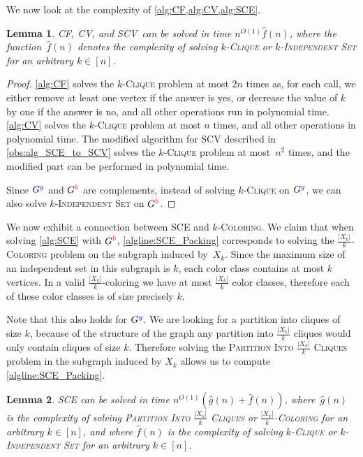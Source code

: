 \documentclass[a4paper,fleqn]{cas-sc}
\newcommand{\friendshipColor}{blue}
\newcommand{\enemyColor}{red}
\newcommand{\agentSetInMaxCoalition}{\ensuremath{X}\xspace}
\newcommand{\friendSuperscript}{{\color{\friendshipColor}g}}
\newcommand{\enemySuperscript}{{\color{\enemyColor}b}}
\newcommand{\friendshipGraph}{\ensuremath{G^{\friendSuperscript}}\xspace}
\newcommand{\enemyGraph}{\ensuremath{G^{\enemySuperscript}}\xspace}
\newcommand{\probname}[1]{\textsc{#1}}
\newcommand{\kclique}[1]{\probname{#1-Clique}\xspace}
\newcommand{\kIS}[1]{\probname{#1-Independent Set}\xspace}
\newcommand{\partitionIntokCliques}[1]{\probname{Partition Into #1 Cliques} \xspace}
\newcommand{\kColouring}[1]{\probname{#1-Coloring}\xspace}
\newcommand{\SCE}{SCE\xspace}
\newcommand{\SCV}{SCV\xspace}
\newcommand{\CF}{CF\xspace}
\newcommand{\CV}{CV\xspace}
\newtheorem{lemma}{Lemma}
\newcommand{\cliqf}{\ensuremath{\hat{f}}}
\newcommand{\cliqparf}{\ensuremath{\hat{g}}}
\begin{document}
We now look at the complexity of \cref{alg:CF,alg:CV,alg:SCE}.

\begin{lemma}
\CF, \CV, and \SCV\ can be solved in time $n^{O(1)} \cliqf(n)$, where the function~$\cliqf(n)$ denotes the complexity of solving \kclique{$k$} or \kIS{$k$} for an arbitrary $k \in [n]$.

     \label{lem:alg_CF_complexity}
\end{lemma}

\begin{proof}
\cref{alg:CF} solves the \kclique{$k$} problem at most $2n$ times as, for each call, we either remove at least one vertex if the answer is yes, or decrease the value of $k$ by one if the answer is no, and all other operations run in polynomial time. \cref{alg:CV} solves the \kclique{$k$} problem at most $n$ times, and all other operations in polynomial time.
The modified algorithm for \SCV described in \cref{obs:alg_SCE_to_SCV} solves the \kclique{$k$} problem at most~$n^2$ times, and the modified part can be performed in polynomial time.

Since \friendshipGraph and \enemyGraph are complements, instead of solving \kclique{$k$} on \friendshipGraph, we can also solve \kIS{$k$} on \enemyGraph. 
\end{proof}




We now exhibit a connection between \SCE and \kColouring{$k$}.
We claim that when solving \cref{alg:SCE} with \enemyGraph, \cref{algline:SCE_Packing} corresponds to solving the \kColouring{$\frac{|\agentSetInMaxCoalition_k|}{k}$} problem on the subgraph induced by~$\agentSetInMaxCoalition_k$. 
Since the maximum size of an independent set in this subgraph is $k$, each color class contains at most $k$ vertices.
In a valid $\frac{|\agentSetInMaxCoalition_k|}{k}$-coloring we have at most $\frac{|\agentSetInMaxCoalition_k|}{k}$ color classes, therefore each of these color classes is of size precisely $k$. 

Note that this also holds for \friendshipGraph. We are looking for a partition into cliques of size $k$, because of the structure of the graph any partition into $\frac{|\agentSetInMaxCoalition_k|}{k}$ cliques would only contain cliques of size $k$. Therefore solving the \partitionIntokCliques{$\frac{|\agentSetInMaxCoalition_k|}{k}$} problem in the subgraph induced by $\agentSetInMaxCoalition_k$ allows us to compute \cref{algline:SCE_Packing}.

\begin{lemma}
\SCE can be solved in time $n^{O(1)}( \cliqparf(n) + \cliqf(n))$, where~$\cliqparf(n)$ is the complexity of solving \partitionIntokCliques{$\frac{|\agentSetInMaxCoalition_k|}{k}$} or \kColouring{$\frac{|\agentSetInMaxCoalition_k|}{k}$} for an arbitrary $k \in [n]$, and where $\cliqf(n)$ is the complexity of solving \kclique{$k$} or \kIS{$k$} for an arbitrary $k \in [n]$.

          \label{lem:alg_SCE_complexity}
\end{lemma}
\end{document}
